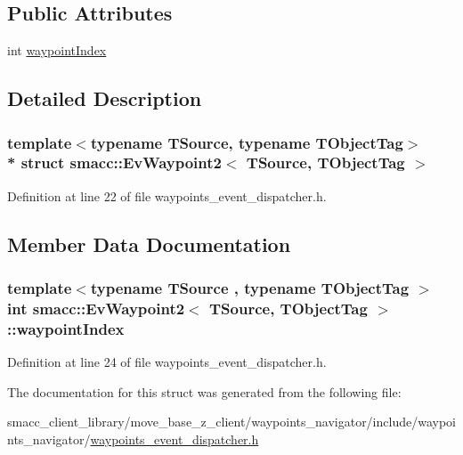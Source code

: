 \subsection*{Public Attributes}
\begin{DoxyCompactItemize}
\item 
int \hyperlink{structsmacc_1_1EvWaypoint2_a473569a39f1b9a0bc4424463e0a8fc55}{waypoint\+Index}
\end{DoxyCompactItemize}


\subsection{Detailed Description}
\subsubsection*{template$<$typename T\+Source, typename T\+Object\+Tag$>$\\*
struct smacc\+::\+Ev\+Waypoint2$<$ T\+Source, T\+Object\+Tag $>$}



Definition at line 22 of file waypoints\+\_\+event\+\_\+dispatcher.\+h.



\subsection{Member Data Documentation}
\subsubsection[{\texorpdfstring{waypoint\+Index}{waypointIndex}}]{\setlength{\rightskip}{0pt plus 5cm}template$<$typename T\+Source , typename T\+Object\+Tag $>$ int {\bf smacc\+::\+Ev\+Waypoint2}$<$ T\+Source, T\+Object\+Tag $>$\+::waypoint\+Index}\hypertarget{structsmacc_1_1EvWaypoint2_a473569a39f1b9a0bc4424463e0a8fc55}{}\label{structsmacc_1_1EvWaypoint2_a473569a39f1b9a0bc4424463e0a8fc55}


Definition at line 24 of file waypoints\+\_\+event\+\_\+dispatcher.\+h.



The documentation for this struct was generated from the following file\+:\begin{DoxyCompactItemize}
\item 
smacc\+\_\+client\+\_\+library/move\+\_\+base\+\_\+z\+\_\+client/waypoints\+\_\+navigator/include/waypoints\+\_\+navigator/\hyperlink{waypoints__event__dispatcher_8h}{waypoints\+\_\+event\+\_\+dispatcher.\+h}\end{DoxyCompactItemize}
